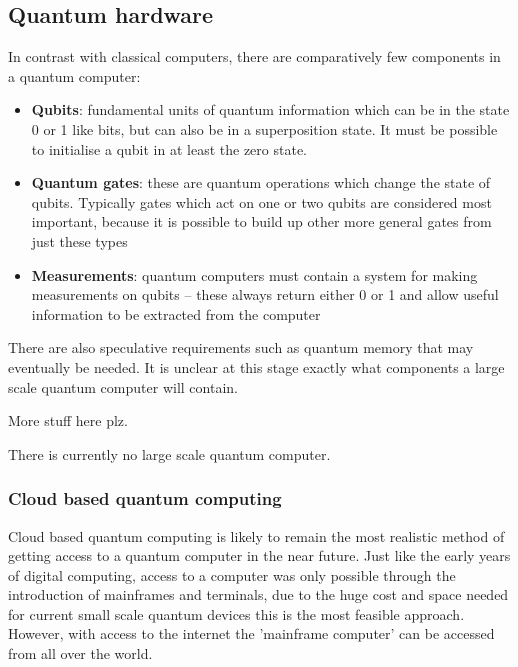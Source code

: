 \subsection{Quantum hardware}

In contrast with classical computers, there are comparatively few components in a quantum computer:

\begin{itemize}
    \item{\textbf{Qubits}: fundamental units of quantum information which can be in the state 0 or 1 like bits, but can also be in a superposition state. It must be possible to initialise a qubit in at least the zero state.}
    \item{\textbf{Quantum gates}: these are quantum operations which change the state of qubits. Typically gates which act on one or two qubits are considered most important, because it is possible to build up other more general gates from just these types}
    \item{\textbf{Measurements}: quantum computers must contain a system for making measurements on qubits -- these always return either 0 or 1 and allow useful information to be extracted from the computer} 
\end{itemize}

There are also speculative requirements such as quantum memory that may eventually be needed. It is unclear at this stage exactly what components a large scale quantum computer will contain.

More stuff here plz.

There is currently no large scale quantum computer.

\subsubsection{Cloud based quantum computing}

Cloud based quantum computing is likely to remain the most realistic method of getting access to a quantum computer in the near future. Just like the early years of digital computing, access to a computer was only possible through the introduction of mainframes and terminals, due to the huge cost and space needed for current small scale quantum devices this is the most feasible approach. However, with access to the internet the 'mainframe computer' can be accessed from all over the world. 

